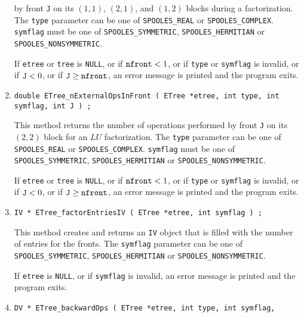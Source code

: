 \begin{enumerate}
by front {\tt J} on its $(1,1)$, $(2,1)$, and $(1,2)$ blocks
during a factorization.
The {\tt type} parameter can be one of {\tt SPOOLES\_REAL} or
{\tt SPOOLES\_COMPLEX}.
{\tt symflag} must be one of {\tt SPOOLES\_SYMMETRIC},
{\tt SPOOLES\_HERMITIAN} or {\tt SPOOLES\_NONSYMMETRIC}.
\par {}
If {\tt etree} or {\tt tree} is {\tt NULL},
or if $\mbox{\tt nfront} < 1$,
or if {\tt type} or {\tt symflag} is invalid,
or if ${\tt J} < 0$,
or if ${\tt J} \ge {\tt nfront}$,
an error message is printed and the program exits.
\item
\begin{verbatim}
double ETree_nExternalOpsInFront ( ETree *etree, int type, int symflag, int J ) ;
\end{verbatim}
This method returns the number of operations performed by front 
{\tt J} on its $(2,2)$ block for an $LU$ factorization.
The {\tt type} parameter can be one of {\tt SPOOLES\_REAL} or
{\tt SPOOLES\_COMPLEX}.
{\tt symflag} must be one of {\tt SPOOLES\_SYMMETRIC},
{\tt SPOOLES\_HERMITIAN} or {\tt SPOOLES\_NONSYMMETRIC}.
\par {}
If {\tt etree} or {\tt tree} is {\tt NULL},
or if $\mbox{\tt nfront} < 1$,
or if {\tt type} or {\tt symflag} is invalid,
or if ${\tt J} < 0$,
or if ${\tt J} \ge {\tt nfront}$,
an error message is printed and the program exits.
\item
\begin{verbatim}
IV * ETree_factorEntriesIV ( ETree *etree, int symflag ) ;
\end{verbatim}
This method creates and returns an {\tt IV} object that is filled
with the number of entries for the fronts.
The {\tt symflag} parameter can be one of {\tt SPOOLES\_SYMMETRIC},
{\tt SPOOLES\_HERMITIAN} or {\tt SPOOLES\_NONSYMMETRIC}.
\par {}
If {\tt etree} is {\tt NULL},
or if {\tt symflag} is invalid,
an error message is printed and the program exits.
\item
\begin{verbatim}
DV * ETree_backwardOps ( ETree *etree, int type, int symflag,

\end{verbatim}
\end{enumerate}
